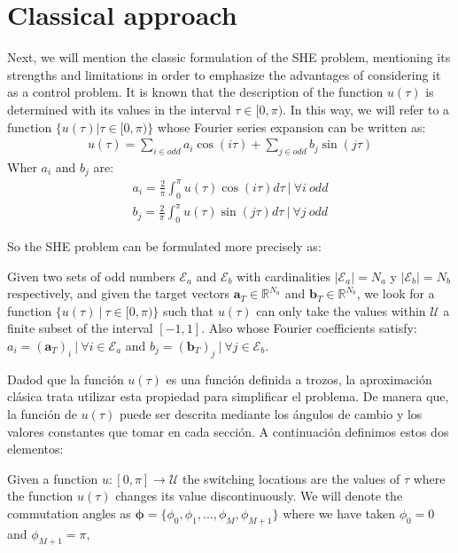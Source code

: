 \section{Classical approach}

Next, we will mention the classic formulation of the SHE problem, mentioning its strengths and limitations in order to emphasize the advantages of considering it as a control problem. It is known that the description of the function $ u (\tau) $ is determined with its values in the interval $ \tau \in [0, \pi) $. In this way, we will refer to a function $ \{u (\tau) | \tau \in [0, \pi) \} $ whose Fourier series expansion can be written as:
\begin{gather}
    u(\tau ) = \sum_{i \in odd} a_i \cos(i\tau)+ \sum_{j \in odd}  b_j \sin(j \tau) 
\end{gather}
Wher $a_i$ and $b_j$  are:
\begin{gather}
    a_i = \frac{2}{\pi} \int_0^\pi u(\tau ) \cos(i \tau)d\tau \ | \ \forall i \ odd \label{an}\\
    b_j = \frac{2}{\pi} \int_0^\pi u(\tau)  \sin(j \tau) d\tau \ | \ \forall j \ odd \label{bn}
\end{gather}

So the SHE problem can be formulated more precisely as:

\begin{problem}[SHE]\label{SHEp}
    Given two sets of odd numbers $ \mathcal{E} _a $ and $ \mathcal{E} _b $ with cardinalities $ | \mathcal{E} _a | = N_a $ y $ | \mathcal{E} _b | = N_b $ respectively, 
    and given the target vectors $ \bm {a} _T \in \mathbb {R}^{N_a} $ and $ \bm {b} _T \in \mathbb {R} ^ {N_b} $, we look for a function $ \{u (\tau) \ | \ \tau \in [0, \pi) \} $ such that $ u (\tau) $ can only take the values within $ \mathcal{U} $ a finite subset of the interval $ [- 1,1] $. 
    Also whose Fourier coefficients satisfy: $ a_i = (\bm {a} _T) _i \ | \ \forall i \in \mathcal{E} _a $ and $ b_j = (\bm {b} _T) _j \ | \ \forall j \in \mathcal{E} _b $.
\end{problem}

Dadod que la función $u(\tau)$ es una función definida a trozos, la aproximación clásica trata utilizar esta propiedad para simplificar el problema. De manera que, la función de $u(\tau)$ puede ser descrita mediante los ángulos de cambio y los valores constantes que tomar en cada sección. A continuación definimos estos dos elementos: 

\begin{definition}
    Given a function $ u: [0, \pi] \rightarrow \mathcal{U} $ the switching locations are the values of $ \tau $ where the function $u(\tau)$ changes its value discontinuously. We will denote the commutation angles as $ \bm {\phi} = \{\phi_0, \phi_1, \dots, \phi_M, \phi_ {M + 1} \} $ where we have taken $ \phi_0 = 0 $ and $ \phi_ {M + 1} = \pi $,
\end{definition}

